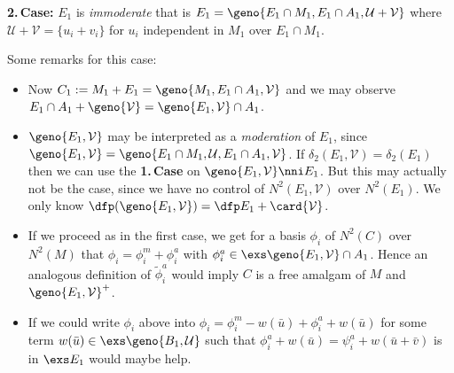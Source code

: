\bigskip
{\bf 2.{}\,Case:}
$E_{1}$ is {\em immoderate} that is $E_{1}=\geno{E_{1}\cap M_{1},E_{1}\cap A_{1},\mathcal{U+V}}$
where $\mathcal{U+V}=\{u_{i}+v_{i}\}$ for $u_{i}$ independent in $M_{1}$ over $E_{1}\cap M_{1}$.

\smallskip
Some remarks for this case:
\begin{itemize}
\item Now $C_{1}:=M_{1}+E_{1}=\geno{M_{1},E_{1}\cap A_{1},\mathcal{V}}$
and we may observe\\
$E_{1}\cap A_{1}+\geno{\mathcal{V}}=\geno{E_{1},\mathcal{V}}\cap
A_{1}$.
\item $\geno{E_{1},\mathcal{V}}$ may be interpreted as a \emph{moderation} of $E_{1}$,
since $\geno{E_{1},\mathcal{V}}=\geno{E_{1}\cap M_{1},\mathcal{U},E_{1}\cap A_{1},\mathcal{V}}$. If $\delta_{2}(E_{1},\mathcal{V})=\delta_{2}(E_{1})$ then we can use the {\bf 1.{}\,Case}
on $\geno{E_{1},\mathcal{V}}\nni E_{1}$. But this may actually not be the case, since
we have no control of $N^{2}(E_{1},\mathcal{V})$ over $N^{2}(E_{1})$. We only
know $\dfp(\geno{E_{1},\mathcal{V}})=\dfp E_{1}+\card{\mathcal{V}}$.

\item If we proceed as in the first case, we get for a basis $\phi_{i}$ of $N^{2}(C)$ over
$N^{2}(M)$ that $\phi_{i}=\phi_{i}^{m}+\phi_{i}^{a}$ with $\phi_{i}^{a}\in\exs \geno{E_{1},\mathcal{V}}\cap A_{1}$. Hence an analogous definition of $\tilde\phi _{i}^{a}$ would
imply $C$ is a free amalgam of $M$ and $\geno{E_{1},\mathcal{V}}^{+}$.

\item If we could write $\phi_{i}$ above into $\phi_{i}=\phi_{i}^{m}-w(\bar u)+
\phi_{i}^{a}+w(\bar u)$ for some term $w(\bar u)\in\exs\geno{B_{1},\mathcal{U}}$ such that
$\phi_{i}^{a}+w(\bar u)=\psi_{i}^{a}+w(\bar u + \bar v)$ is in $\exs E_{1}$ would maybe help.
\end{itemize}